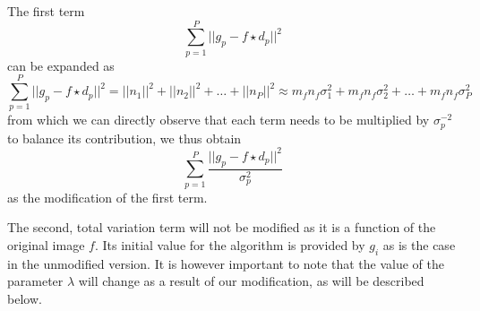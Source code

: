 \documentclass[12pt,notitlepage]{report}
\begin{document}
The first term  
\begin{equation}
\label{eq:srou03_term_1_ext}
	\sum_{p=1}^{P} || g_p - f \star d_p ||^2 	
\end{equation}
can be expanded as 
\begin{equation}
\label{eq:srou03_term_1_ext_exp}
	\sum_{p=1}^{P} || g_p - f \star d_p ||^2 = ||n_1||^2 + ||n_2||^2 + \dots + ||n_P||^2 \approx m_f n_f \sigma_1^2 + m_f n_f \sigma_2^2 + \dots + m_f n_f \sigma_P^2 	
\end{equation}
from which we can directly observe that each term needs to be multiplied by $\sigma_p^{-2}$ to balance its contribution, we thus obtain
\begin{equation}
\label{eq:srou03_term_1_ext}
	\sum_{p=1}^{P} \frac{|| g_p - f \star d_p ||^2}{\sigma_p^2} 	
\end{equation}
as the modification of the first term.

The second, total variation term will not be modified as it is a function of the original image $f$. Its initial value for the algorithm is provided by $g_i$ as is the case in the unmodified version.
It is however important to note that the value of the parameter $\lambda$ will change as a result of our modification, as will be described below. 
\end{document}
